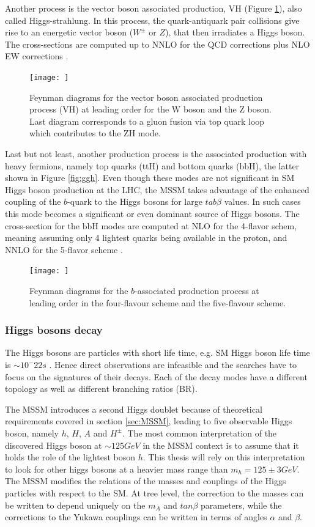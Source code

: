 Another process is the vector boson associated production, VH (Figure \ref{fig:vh}), also called Higgs-strahlung. In this process, the quark-antiquark pair collisions give rise to an energetic vector boson ($W^{\pm}$ or $Z$), that then irradiates a Higgs boson. The cross-sections are computed up to NNLO for the QCD corrections plus NLO EW corrections \cite{deFlorian:2227475}.

\begin{figure}
    \centering
    \texttt{[image: ]}
    \caption{Feynman diagrams for the vector boson associated production process (VH) at leading order for the W boson and the Z boson. Last diagram corresponds to a gluon fusion via top quark loop which contributes to the ZH mode.}
    \label{fig:vh}
\end{figure}

Last but not least, another production process is the associated production with heavy fermions, namely top quarks (ttH) and bottom quarks (bbH), the latter shown in Figure \ref{fig:ggh}. Even though these modes are not significant in SM Higgs boson production at the LHC, the MSSM takes advantage of the enhanced coupling of the $b$-quark to the Higgs bosons for large $tab \beta$ values. In such cases this mode becomes a significant or even dominant source of Higgs bosons. The cross-section for the bbH modes are computed at NLO for the 4-flavor schem, meaning assuming only 4 lightest quarks being available in the proton, and NNLO for the 5-flavor scheme \cite{deFlorian:2227475}.

\begin{figure}
    \centering
    \texttt{[image: ]}
    \caption{Feynman diagrams for the $b$-associated production process at leading order in the four-flavour scheme and the five-flavour scheme.}
    \label{fig:bbh}
\end{figure}

\subsubsection{Higgs bosons decay}

The Higgs bosons are particles with short life time, e.g. SM Higgs boson life time is $\sim 10^-22 s$ \cite{pdg2016}. Hence direct observations are infeasible and the searches have to focus on the signatures of their decays. Each of the decay modes have a different topology as well as different branching ratios (BR). 

The MSSM introduces a second Higgs doublet because of theoretical requirements covered in section \ref{sec:MSSM}, leading to five observable Higgs boson, namely $h$, $H$, $A$ and $H^{\pm}$. The most common interpretation of the discovered Higgs boson at $\sim 125 GeV$ in the MSSM context is to assume that it holds the role of the lightest boson $h$. This thesis will rely on this interpretation to look for other higgs bosons at a heavier mass range than $m_h = 125 \pm 3 GeV$. The MSSM modifies the relations of the masses and couplings of the Higgs particles with respect to the SM. At tree level, the correction to the masses can be written to depend uniquely on the $m_A$ and $tan \beta$ parameters, while the corrections to the Yukawa couplings can be written in terms of angles $\alpha$ and $\beta$.

